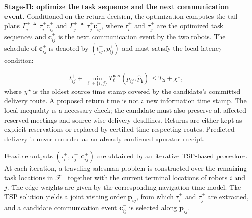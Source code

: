 \textbf{Stage-II: optimize the task sequence and the next
communication event}.
Conditioned on the return decision, the optimization computes the tail plans
$\Gamma_i^{+} \triangleq \tau_i^{+}\mathbf{c}_{ij}^{+}$ and
$\Gamma_j^{+} \triangleq \tau_j^{+}\mathbf{c}_{ij}^{+}$, where
$\tau_i^{+}$ and $\tau_j^{+}$ are the optimized task sequences and
$\mathbf{c}_{ij}^{+}$ is the next communication event by the two robots.
The schedule of $\mathbf{c}_{ij}^{+}$ is denoted by
$(t_{ij}^{+}, p_{ij}^{+})$ and must satisfy the local latency condition:
\begin{revision}
\begin{equation}
\label{ch05:eq:pairing_cond}
t_{ij}^++\min_{\ell\in\{i,j\}}
T_\ell^{\texttt{nav}}(p_{ij}^+,\widehat p_{\texttt h})
\le T_{\texttt h}+\chi^\star,
\end{equation}
where $\chi^\star$ is the oldest source time stamp covered by the
candidate's committed delivery route. A proposed return time is not a new
information time stamp. The local inequality is a necessary check; the
candidate must also preserve all affected reserved meetings and source-wise
delivery deadlines. Returns are either kept as explicit reservations or
replaced by certified time-respecting routes. Predicted delivery is never
recorded as an already confirmed operator receipt.
\end{revision}
Feasible outputs $(\tau_i^{+}, \tau_j^{+}, \mathbf{c}_{ij}^{+})$ are obtained
by an iterative TSP-based procedure. At each iteration, a traveling-salesman
problem is constructed over the remaining task locations in $\mathcal{F}^{-}$
together with the current terminal locations of robots $i$ and $j$. The edge
weights are given by the corresponding navigation-time model. The TSP solution
yields a joint visiting order $\mathbf{p}_{ij}$, from which
$\tau_i^{+}$ and $\tau_j^{+}$ are extracted, and a candidate communication
event $\mathbf{c}_{ij}^{+}$ is selected along $\mathbf{p}_{ij}$. 

